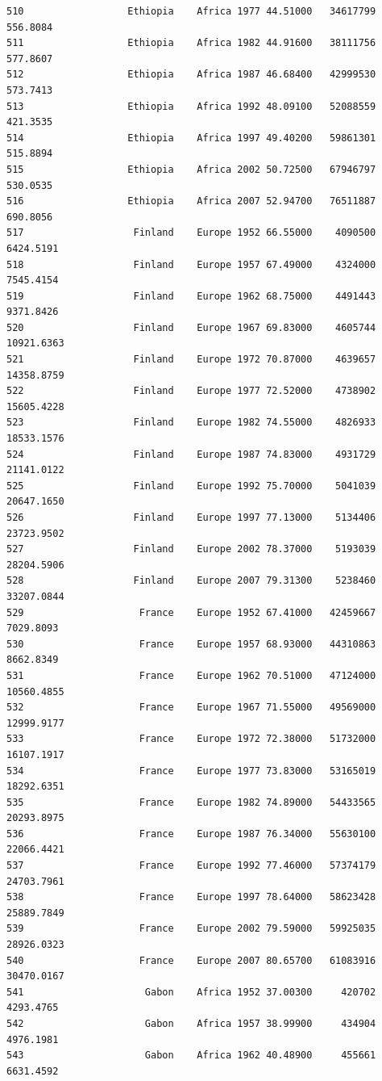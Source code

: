\documentclass[
  letterpaper,
  DIV=11,
  numbers=noendperiod]{scrreprt}
\begin{document}
\begin{verbatim}
510                  Ethiopia    Africa 1977 44.51000   34617799    556.8084
511                  Ethiopia    Africa 1982 44.91600   38111756    577.8607
512                  Ethiopia    Africa 1987 46.68400   42999530    573.7413
513                  Ethiopia    Africa 1992 48.09100   52088559    421.3535
514                  Ethiopia    Africa 1997 49.40200   59861301    515.8894
515                  Ethiopia    Africa 2002 50.72500   67946797    530.0535
516                  Ethiopia    Africa 2007 52.94700   76511887    690.8056
517                   Finland    Europe 1952 66.55000    4090500   6424.5191
518                   Finland    Europe 1957 67.49000    4324000   7545.4154
519                   Finland    Europe 1962 68.75000    4491443   9371.8426
520                   Finland    Europe 1967 69.83000    4605744  10921.6363
521                   Finland    Europe 1972 70.87000    4639657  14358.8759
522                   Finland    Europe 1977 72.52000    4738902  15605.4228
523                   Finland    Europe 1982 74.55000    4826933  18533.1576
524                   Finland    Europe 1987 74.83000    4931729  21141.0122
525                   Finland    Europe 1992 75.70000    5041039  20647.1650
526                   Finland    Europe 1997 77.13000    5134406  23723.9502
527                   Finland    Europe 2002 78.37000    5193039  28204.5906
528                   Finland    Europe 2007 79.31300    5238460  33207.0844
529                    France    Europe 1952 67.41000   42459667   7029.8093
530                    France    Europe 1957 68.93000   44310863   8662.8349
531                    France    Europe 1962 70.51000   47124000  10560.4855
532                    France    Europe 1967 71.55000   49569000  12999.9177
533                    France    Europe 1972 72.38000   51732000  16107.1917
534                    France    Europe 1977 73.83000   53165019  18292.6351
535                    France    Europe 1982 74.89000   54433565  20293.8975
536                    France    Europe 1987 76.34000   55630100  22066.4421
537                    France    Europe 1992 77.46000   57374179  24703.7961
538                    France    Europe 1997 78.64000   58623428  25889.7849
539                    France    Europe 2002 79.59000   59925035  28926.0323
540                    France    Europe 2007 80.65700   61083916  30470.0167
541                     Gabon    Africa 1952 37.00300     420702   4293.4765
542                     Gabon    Africa 1957 38.99900     434904   4976.1981
543                     Gabon    Africa 1962 40.48900     455661   6631.4592

\end{verbatim}
\end{document}
